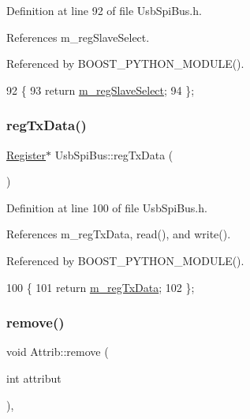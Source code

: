 Definition at line 92 of file Usb\+Spi\+Bus.\+h.



References m\+\_\+reg\+Slave\+Select.



Referenced by B\+O\+O\+S\+T\+\_\+\+P\+Y\+T\+H\+O\+N\+\_\+\+M\+O\+D\+U\+L\+E().


\begin{DoxyCode}
92                              \{
93     \textcolor{keywordflow}{return} \hyperlink{classUsbSpiBus_a5cdebdc06a79322c0802fbc523cade91}{m\_regSlaveSelect};
94   \};
\end{DoxyCode}
\mbox{\label{classUsbSpiBus_ab8044b2af7209f9eb37c0a96e3e28637}} 
\subsubsection{\texorpdfstring{reg\+Tx\+Data()}{regTxData()}}
{\footnotesize\ttfamily \hyperlink{classRegister}{Register}$\ast$ Usb\+Spi\+Bus\+::reg\+Tx\+Data (\begin{DoxyParamCaption}{ }\end{DoxyParamCaption})\hspace{0.3cm}{\ttfamily [inline]}}



Definition at line 100 of file Usb\+Spi\+Bus.\+h.



References m\+\_\+reg\+Tx\+Data, read(), and write().



Referenced by B\+O\+O\+S\+T\+\_\+\+P\+Y\+T\+H\+O\+N\+\_\+\+M\+O\+D\+U\+L\+E().


\begin{DoxyCode}
100                         \{
101     \textcolor{keywordflow}{return} \hyperlink{classUsbSpiBus_ae4b9ec4d035b9a507735b28dba04556c}{m\_regTxData};
102   \};
\end{DoxyCode}
\mbox{\label{classAttrib_a7d4ef7e32d93cb287792b87b857e79f3}} 
\subsubsection{\texorpdfstring{remove()}{remove()}}
{\footnotesize\ttfamily void Attrib\+::remove (\begin{DoxyParamCaption}\item[{int}]{attribut }\end{DoxyParamCaption})\hspace{0.3cm}{\ttfamily [inline]}, {\ttfamily [inherited]}}

